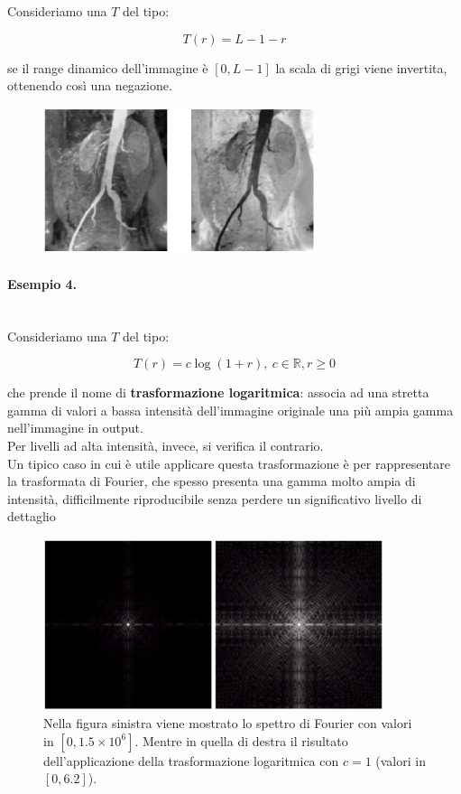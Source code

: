 Consideriamo una $T$ del tipo:

$$
    T(r) = L - 1 - r
$$

se il range dinamico dell'immagine è $[0, L - 1]$
la scala di grigi viene invertita, ottenendo così una negazione.

\begin{figure}[H]
    \centering
    \includegraphics[width=8cm, keepaspectratio]{capitoli/immagini/imgs/angiografie_esempio_3.jpg}
\end{figure}

\paragraph{Esempio 4.}\ \\

Consideriamo una $T$ del tipo:

$$
    T(r) = c \log(1 + r), \ c \in  \mathbb{R}, r \geq 0
$$

che prende il nome di \textbf{trasformazione logaritmica}: associa ad una
stretta gamma di valori a bassa intensità dell'immagine originale
una più ampia gamma nell'immagine in output.\\
Per livelli ad alta intensità, invece, si verifica il contrario.\\
Un tipico caso in cui è utile applicare questa trasformazione è per
rappresentare la trasformata di Fourier, che spesso presenta una
gamma molto ampia di intensità, difficilmente riproducibile senza
perdere un significativo livello di dettaglio

\begin{figure}[H]
    \centering
    \includegraphics[width=10cm, keepaspectratio]{capitoli/immagini/imgs/trasformazione_logaritmica_esempio_4.jpg}
    \caption{Nella figura sinistra viene mostrato lo spettro di Fourier con valori in $[0, 1.5 \times 10^6]$. Mentre in quella di destra il risultato dell'applicazione della trasformazione logaritmica
        con $c = 1$ (valori in $[0, 6.2]$).
    }
\end{figure}

